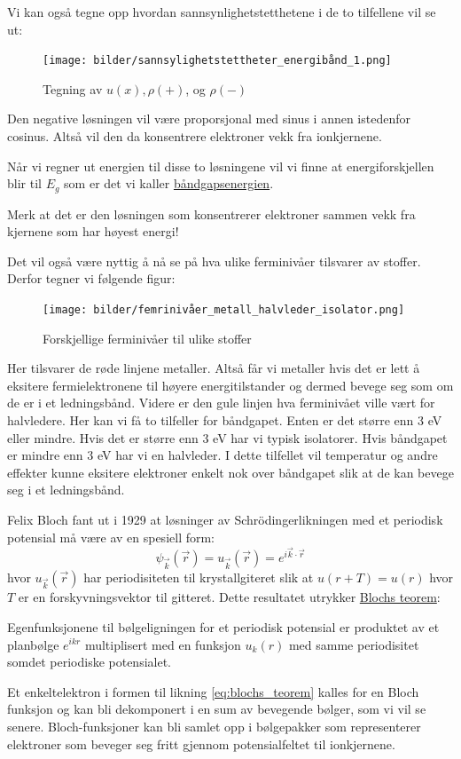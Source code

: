 \documentclass{article}
\begin{document}
Vi kan også tegne opp hvordan sannsynlighetstetthetene i de to tilfellene vil se ut:
\begin{figure}[H]
    \centering
    \texttt{[image: bilder/sannsylighetstettheter\_energibånd\_1.png]}
    \caption{Tegning av $u(x), \rho(+)$, og $\rho(-)$}
    \label{fig:sannsylighetstettheter_energibånd_1}
\end{figure}
Den negative løsningen vil være proporsjonal med sinus i annen istedenfor cosinus. Altså vil den da konsentrere elektroner vekk fra ionkjernene.

Når vi regner ut energien til disse to løsningene vil vi finne at energiforskjellen blir til $E_g$ som er det vi kaller \underline{båndgapsenergien}.

Merk at det er den løsningen som konsentrerer elektroner sammen vekk fra kjernene som har høyest energi!

Det vil også være nyttig å nå se på hva ulike ferminivåer tilsvarer av stoffer. Derfor tegner vi følgende figur:
\begin{figure}[H]
    \centering
    \texttt{[image: bilder/femrinivåer\_metall\_halvleder\_isolator.png]}
    \caption{Forskjellige ferminivåer til ulike stoffer}
    \label{fig:femrinivåer_metall_halvleder_isolator}
\end{figure}
Her tilsvarer de røde linjene metaller. Altså får vi metaller hvis det er lett å eksitere fermielektronene til høyere energitilstander og dermed bevege seg som om de er i et ledningsbånd. Videre er den gule linjen hva ferminivået ville vært for halvledere. Her kan vi få to tilfeller for båndgapet. Enten er det større enn 3 eV eller mindre. Hvis det er større enn 3 eV har vi typisk isolatorer. Hvis båndgapet er mindre enn 3 eV har vi en halvleder. I dette tilfellet vil temperatur og andre effekter kunne eksitere elektroner enkelt nok over båndgapet slik at de kan bevege seg i et ledningsbånd.

Felix Bloch fant ut i 1929 at løsninger av Schrödingerlikningen med et periodisk potensial må være av en spesiell form:
\begin{equation}
    \label{eq:blochs_teorem}
    \boxed{\psi_{\vec{k}}(\vec{r}) = u_{\vec{k}}(\vec{r}) = e^{i \vec{k} \cdot \vec{r}}}
\end{equation}
hvor $u_{\vec{k}}(\vec{r})$ har periodisiteten til krystallgiteret slik at $u(r + T) = u(r)$ hvor $T$ er en forskyvningsvektor til gitteret. Dette resultatet utrykker \underline{Blochs teorem}:
\begin{center}
\begin{adjustbox}{width=0.85\textwidth}
\parbox{\linewidth}{
Egenfunksjonene til bølgeligningen for et periodisk potensial er produktet av et planbølge $e^{i k r}$ multiplisert med en funksjon $u_k(r)$ med samme periodisitet somdet periodiske potensialet.
}
\end{adjustbox}
\end{center}
Et enkeltelektron i formen til likning \ref{eq:blochs_teorem} kalles for en Bloch funksjon og kan bli dekomponert i en sum av bevegende bølger, som vi vil se senere. Bloch-funksjoner kan bli samlet opp i bølgepakker som representerer elektroner som beveger seg fritt gjennom potensialfeltet til ionkjernene.
\end{document}
